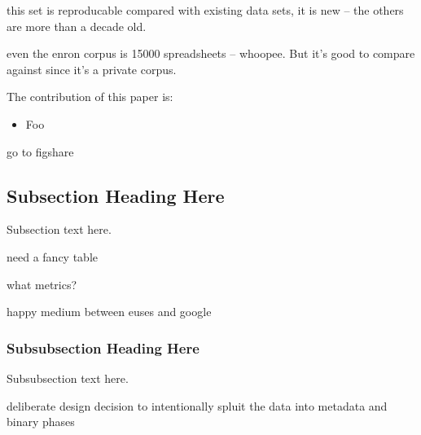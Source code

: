 \documentclass[conference]{IEEEtran}
\begin{document}
this set is reproducable
compared with existing data sets, it is new -- the others are more than a decade old.

even the enron corpus is 15000 spreadsheets -- whoopee. But it's good to compare against since it's a private corpus.

The contribution of this paper is:

\begin{itemize}
\item Foo
\end{itemize}

go to figshare

\subsection{Subsection Heading Here}
Subsection text here.

need a fancy table

what metrics?

happy medium between euses and google

\subsubsection{Subsubsection Heading Here}
Subsubsection text here.

deliberate design decision to 
intentionally spluit the data into metadata and binary phases


%
%
\end{document}
